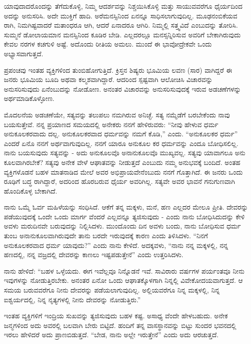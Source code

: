ಯಾವುದಾದರೊಂದನ್ನು ತೆಗೆದುಕೊಳ್ಳಿ, ನಿಮ್ಮ ಆದರ್ಶವನ್ನು ನಿಶ್ಚಯಿಸಿಕೊಳ್ಳಿ ಮತ್ತು ಸಾಯುವವರೆಗೂ ಧೈರ್ಯದಿಂದ ಅದನ್ನು ಅನುಸರಿಸಿ. ಅದೇ ಮುಕ್ತಿಗೆ ಹಾದಿ. ಅರೆಮನಸ್ಸಿನಿಂದ ಏನನ್ನೂ ಸಾಧಿಸಲಾಗುವುದಿಲ್ಲ. ಮೂಢನಂಬಿಕೆಯವ ರಾಗಿ, ನಿಮಗಿಷ್ಟವಾದರೆ ಮತಾಂಧರೂ ಆಗಿ, ಆದರೆ ಏನಾದರೂ ಆಗಿರಿ. ನಿಮ್ಮಲ್ಲಿ ಸತ್ತ್ವವಿದೆ ಎಂಬುದನ್ನು ತೋರಿಸಿ. ಸುಮ್ಮನೆ ಡೋಲಾಯಮಾನ ಮನಸ್ಸಿನಿಂದ ಕೂಡಿರ ಬೇಡಿ. ಎಲ್ಲದರಲ್ಲೂ ಮನಸ್ಸನ್ನಿರಿಸುವ ಅವರಿಗೆ ಬೇಕಾಗಿರುವುದು ಕೇವಲ ನರಗಳ ಕಚಗುಳಿ ಅಷ್ಟೆ. ಅದೊಂದು ರೀತಿಯ ಅಮಲು. ಮುಂದೆ ಈ ಭಾವೋದ್ರೇಕವೇ ಒಂದು ಅಭ್ಯಾಸವಾಗುತ್ತದೆ.

ಪ್ರಪಂಚವು ಇಂತಹ ವ್ಯಕ್ತಿಗಳಿಂದ ತುಂಬಿಹೋಗುತ್ತಿದೆ. ಕ್ರಿಸ್ತನ ಶಿಷ್ಯರು ಭೂಮಿಯ ಲವಣ (ಸಾರ) ವಾಗಿದ್ದರೆ  ಈ ಜನರು ಭೂಮಿಯ ಬೂದಿ ಅಥವಾ ಕಲ್ಮಶವಾಗಿದ್ದಾರೆ. ಆದರಿಂದ ಸ್ಪಷ್ಟವಾಗಿ ಆಲೋಚಿಸಿ ವಿಚಾರವನ್ನು ಅನುಸರಿಸುವುದು ಏನೆಂಬುದನ್ನು ನೋಡೋಣ. ಅನಂತರ ವಿಚಾರವನ್ನು ಅನುಸರಿಸುವುದಕ್ಕೆ ಇರುವ ಅಡಚಣೆಗಳನ್ನು ಅರ್ಥಮಾಡಿಕೊಳ್ಳೋಣ.

ಮೊದಲನೆಯ ಅಡಚಣೆಯೇ, ಸತ್ಯವನ್ನು ತಲುಪಲು ನಮಗಿರುವ ಅನಿಚ್ಛೆ. ಸತ್ಯ ನಮ್ಮೆಡೆಗೆ ಬರಬೇಕೆಂದು ನಾವು ಬಯಸುತ್ತೇವೆ. ನನ್ನ ಪ್ರಯಾಣದ ಸಮಯದಲ್ಲಿ ಅನೇಕರು ನನಗೆ ಹೇಳಿರುವರು: “ನೀವು ಹೇಳುವ ಧರ್ಮ ಅನುಕೂಲಕರವಾದು ದಲ್ಲ. ಅನುಕೂಲಕರವಾದ ಧರ್ಮವನ್ನು ನಮಗೆ ಕೊಡಿ,” ಎಂದು. “ಅನುಕೂಲಕರ ಧರ್ಮ” ಎಂದರೆ ಏನೊ ನನಗೆ ಅರ್ಥವಾಗುವುದಿಲ್ಲ. ನನಗೆ ಯಾರೂ ಅನುಕೂಲ ಕರ ಧರ್ಮವನ್ನು ಎಂದೂ ಬೋಧಿಸಲಿಲ್ಲ. ನಾನು ಬಯಸುವುದು ಸತ್ಯವನ್ನು - ಅದು ಅನುಕೂಲವೊ ಅನಾನುಕೂಲವೊ ಮುಖ್ಯವಲ್ಲ. ಸತ್ಯವು ಯಾವಾಗಲೂ ಅನು ಕೂಲವಾಗಿರಬೇಕೆ? ಸತ್ಯವು ಅನೇಕ ವೇಳೆ ಆಘಾತವನ್ನು ನೀಡುತ್ತದೆ ಎಂಬುದು ನಮ್ಮ ಅನುಭವಕ್ಕೆ ಬಂದಿದೆ. ಅಂತಹ ವ್ಯಕ್ತಿಗಳೊಡನೆ ಬಹಳ ಮಾತನಾಡಿದ ಮೇಲೆ ಅವರ ಅಭಿಪ್ರಾಯವೇನೆಂಬುದು ನನಗೆ ಗೊತ್ತಾಗಿದೆ. ಈ ಜನರು ಒಂದು ರೂಢಿಗೆ ಬದ್ಧ ರಾಗಿದ್ದಾರೆ, ಅದರಿಂದ ಹೊರಬರುವ ಧೈರ್ಯ ಅವರಿಗಿಲ್ಲ. ಸತ್ಯವೇ ಅವರ ಭಾವನೆ ಗನುಗುಣವಾಗಿ ಹೊಂದಿಕೊಳ್ಳ ಬೇಕಾಗಿದೆ.

ನಾನು ಒಮ್ಮೆ ಓರ್ವ ಮಹಿಳೆಯನ್ನು ಸಂಧಿಸಿದೆ. ಆಕೆಗೆ ತನ್ನ ಮಕ್ಕಳು, ಮನೆ, ಹಣ ಎಲ್ಲದರ ಮೇಲೂ ಪ್ರೀತಿ. ದೇವರನ್ನು ಪಡೆಯುವುದಕ್ಕೆ ಒಂದೇ ಒಂದು ಮಾರ್ಗ ವೆಂದರೆ ಎಲ್ಲವನ್ನೂ ತ್ಯಜಿಸುವುದು - ಎಂದು ನಾನು ಬೋಧಿಸಿದುದನ್ನು ಕೇಳಿ ಅವಳು ಮರುದಿನವೇ ಬರುವುದನ್ನು ನಿಲ್ಲಿಸಿದಳು. ಮುಂದೊಂದು ದಿನ ಅವಳು ಬಂದು, ನಾನು ಬೋಧಿಸುವ ಧರ್ಮ ತುಂಬ ಅನಾನುಕೂಲವಾಗಿರುವುದೇ ತಾನು ಬರದೇ ಇರುವುದಕ್ಕೆ ಕಾರಣ ಎಂದು ತಿಳಿಸಿದಳು. “ನಿನಗೆ ಅನುಕೂಲಕರವಾದ ಧರ್ಮ ಯಾವುದು?” ಎಂದು ನಾನು ಕೇಳಿದೆ. ಅದಕ್ಕವಳು, “ನಾನು ನನ್ನ ಮಕ್ಕಳಲ್ಲಿ, ನನ್ನ ಹಣದಲ್ಲಿ, ನನ್ನ ವಜ್ರದಲ್ಲಿ ದೇವರನ್ನು ಕಾಣಲು ಇಷ್ಟಪಡುತ್ತೇನೆ” ಎಂದು ಉತ್ತರಿಸಿದಳು.

ನಾನು ಹೇಳಿದೆ: “ಬಹಳ ಒಳ್ಳೆಯದು. ಈಗ ಇವೆಲ್ಲವೂ ನಿನ್ನೊಡನೆ ಇವೆ. ಸಾವಿರಾರು ವರ್ಷಗಳ ಪರ್ಯಂತವೂ ನೀನು ಇವುಗಳನ್ನು ನೋಡುತ್ತಿರಬೇಕು. ಅನಂತರ ಏನೋ ಒಂದು ಆಘಾತಕ್ಕೊಳಗಾಗಿ ನಿನ್ನಲ್ಲಿ ವಿವೇಕೋದಯವಾಗುತ್ತದೆ. ಆ ಸಮಯ ಬರುವವರೆಗೂ ನೀನು ದೇವರನ್ನು ಪಡೆಯಲಾಗುವುದಿಲ್ಲ. ಅಲ್ಲಿಯವರೆಗೂ ನಿನ್ನ ಮಕ್ಕಳಲ್ಲಿ, ನಿನ್ನ ಐಶ್ವರ್ಯದಲ್ಲಿ, ನಿನ್ನ ನೃತ್ಯಗಳಲ್ಲಿ ನೀನು ದೇವರನ್ನು ನೋಡುತ್ತಿರು.”

ಇಂತಹ ವ್ಯಕ್ತಿಗಳಿಗೆ ಇಂದ್ರಿಯ ಸುಖವನ್ನು ತ್ಯಜಿಸುವುದು ಬಹಳ ಕಷ್ಟ. ಅಸಾಧ್ಯ ವೆಂದೇ ಹೇಳಬಹುದು. ಅನೇಕ ಜನ್ಮಗಳಿಂದ ಅದು ಅವರಲ್ಲಿ ಬಲವಾಗಿ ಬೇರು ಬಿಟ್ಟಿದೆ. ಹಂದಿಗೆ ತನ್ನ ವಾಸಸ್ಥಾನವನ್ನು ಬಿಟ್ಟು ಸುಂದರ ಭವನದಲ್ಲಿ ಇರಲು ಹೇಳಿದರೆ ಅದು ಪ್ರಾಣಬಿಡುತ್ತದೆ. “ಬೇಡ, ನಾನು ಅಲ್ಲೇ ಇರುತ್ತೇನೆ” ಎಂದು ಅದು ಆರಚುತ್ತದೆ.

